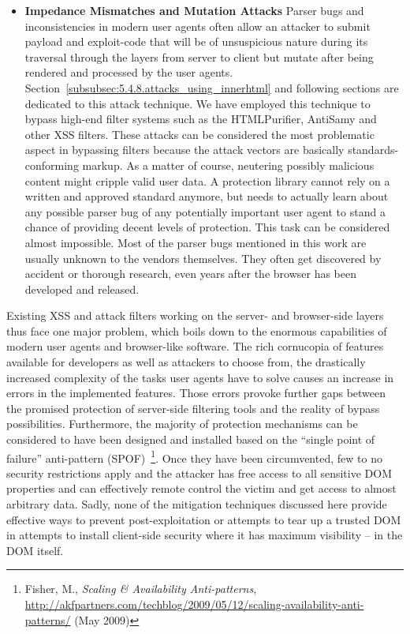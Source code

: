 \begin{itemize}
 \item \textbf{Impedance Mismatches and Mutation Attacks} Parser bugs and inconsistencies in modern user agents often allow an attacker to submit payload and exploit-code that will be of unsuspicious nature during its traversal through the layers from server to client but mutate after being rendered and processed by the user agents. Section~\ref{subsubsec:5.4.8.attacks_using_innerhtml} and following sections are dedicated to this attack technique. We have employed this technique to bypass high-end filter systems such as the HTMLPurifier, AntiSamy and other XSS filters. These attacks can be considered the most problematic aspect in bypassing filters because the attack vectors are basically standards-conforming markup. As a matter of course, neutering possibly malicious content might cripple valid user data. A protection library cannot rely on a written and approved standard anymore, but needs to actually learn about any possible parser bug of any potentially important user agent to stand a chance of providing 
decent levels of protection. This task can be considered almost impossible. Most of the parser bugs mentioned in this work are usually unknown to the vendors themselves. They often get discovered by accident or thorough research, even years after the browser has been developed and released.
\end{itemize}

  Existing XSS and attack filters working on the server- and browser-side layers thus face one major problem, which boils down to the enormous capabilities of modern user agents and browser-like software. The rich cornucopia of features available for developers as well as attackers to choose from, the drastically increased complexity of the tasks user agents have to solve causes an increase in errors in the implemented features. Those errors provoke further gaps between the promised protection of server-side filtering tools and the reality of bypass possibilities. Furthermore, the majority of protection mechanisms can be considered to have been designed and installed based on the ``single point of failure'' anti-pattern (SPOF)~\footnote{Fisher, M., \textit{Scaling \& Availability Anti-patterns}, \url{http://akfpartners.com/techblog/2009/05/12/scaling-availability-anti-patterns/} (May 2009)}. Once they have been circumvented, few to no security restrictions apply and the attacker has free access to all 
sensitive DOM properties and can effectively remote control the victim and get access to almost arbitrary data. Sadly, none of the mitigation techniques discussed here provide effective ways to prevent post-exploitation or attempts to tear up a trusted DOM in attempts to install client-side security where it has maximum visibility -- in the DOM itself.

